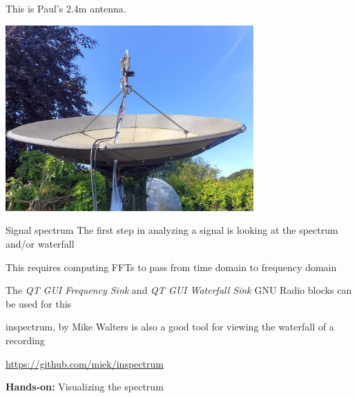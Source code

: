 \documentclass[aspectratio=169]{beamer}
\newcommand{\handson}[1]{\begin{frame}
 \begin{block}{}
   \begin{center}
     \vspace{0.5em}
     {\bf Hands-on:} #1
     \vspace{0.5em}
   \end{center}
 \end{block}
 \end{frame}
}
\begin{document}
\begin{frame}
  This is Paul's 2.4m antenna.

  \begin{center}
    \includegraphics[width = 9.5cm]{10gemedish1}
  \end{center}
\end{frame}

\begin{frame}{Signal spectrum}
  The first step in analyzing a signal is looking at the spectrum and/or waterfall

  This requires computing FFTs to pass from time domain to frequency domain

  \medskip

  The \emph{QT GUI Frequency Sink} and \emph{QT GUI Waterfall Sink} GNU Radio
  blocks can be used for this

  \medskip

  inspectrum, by Mike Walters is also a good tool for viewing the waterfall of a
  recording

  \url{https://github.com/miek/inspectrum}
\end{frame}

\handson{Visualizing the spectrum}
\end{document}
